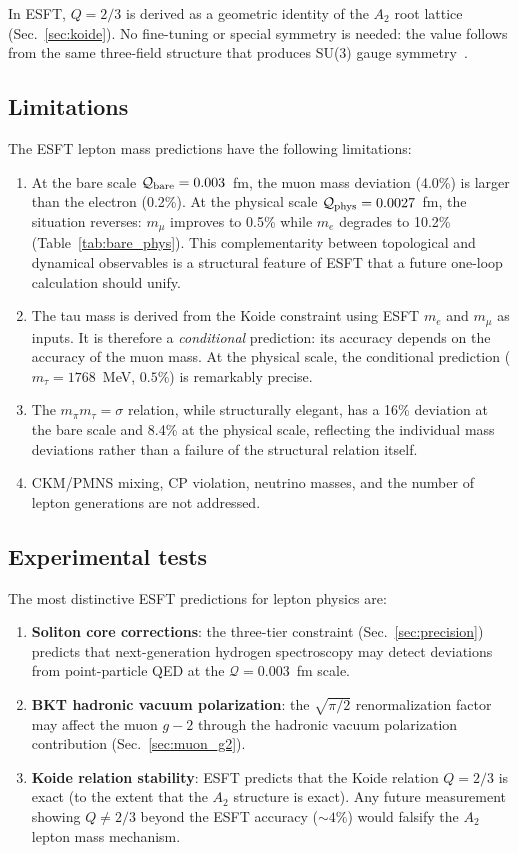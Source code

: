 ﻿\documentclass[twocolumn,preprintnumbers,amsmath,amssymb]{revtex4-2}
\newcommand{\Qoppa}{\mathcal{Q}}
\begin{document}
In ESFT, $Q = 2/3$ is derived as a geometric identity of the $A_2$ root lattice (Sec.~\ref{sec:koide}). No fine-tuning or special symmetry is needed: the value follows from the same three-field structure that produces SU(3) gauge symmetry~\cite{Paper2}.

\subsection{Limitations}

The ESFT lepton mass predictions have the following limitations:

\begin{enumerate}
\item At the bare scale $\Qoppa_{\rm bare} = 0.003$~fm, the muon mass deviation (4.0\%) is larger than the electron (0.2\%). At the physical scale $\Qoppa_{\rm phys} = 0.0027$~fm, the situation reverses: $m_\mu$ improves to 0.5\% while $m_e$ degrades to 10.2\% (Table~\ref{tab:bare_phys}). This complementarity between topological and dynamical observables is a structural feature of ESFT that a future one-loop calculation should unify.
\item The tau mass is derived from the Koide constraint using ESFT $m_e$ and $m_\mu$ as inputs. It is therefore a \emph{conditional} prediction: its accuracy depends on the accuracy of the muon mass. At the physical scale, the conditional prediction ($m_\tau = 1768$~MeV, $0.5\%$) is remarkably precise.
\item The $m_\pi m_\tau = \sigma$ relation, while structurally elegant, has a 16\% deviation at the bare scale and 8.4\% at the physical scale, reflecting the individual mass deviations rather than a failure of the structural relation itself.
\item CKM/PMNS mixing, CP violation, neutrino masses, and the number of lepton generations are not addressed.
\end{enumerate}

\subsection{Experimental tests}

The most distinctive ESFT predictions for lepton physics are:

\begin{enumerate}
\item \textbf{Soliton core corrections}: the three-tier constraint (Sec.~\ref{sec:precision}) predicts that next-generation hydrogen spectroscopy may detect deviations from point-particle QED at the $\Qoppa = 0.003$~fm scale.
\item \textbf{BKT hadronic vacuum polarization}: the $\sqrt{\pi/2}$ renormalization factor may affect the muon $g{-}2$ through the hadronic vacuum polarization contribution (Sec.~\ref{sec:muon_g2}).
\item \textbf{Koide relation stability}: ESFT predicts that the Koide relation $Q = 2/3$ is exact (to the extent that the $A_2$ structure is exact). Any future measurement showing $Q \neq 2/3$ beyond the ESFT accuracy ($\sim 4\%$) would falsify the $A_2$ lepton mass mechanism.
\end{enumerate}
\end{document}
